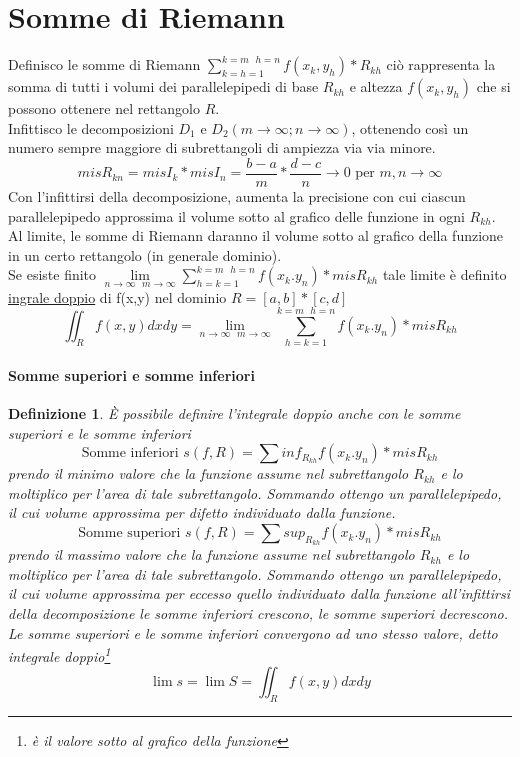 \documentclass{book}
\newtheorem{defi}{Definizione}
\begin{document}
\section{Somme di Riemann}
Definisco le somme di Riemann $\displaystyle\sum^{k=m\text{ } h=n}_{k=h=1}f(x_k,y_h)*R_{kh}$ ciò
rappresenta la somma di tutti i volumi dei parallelepipedi di base $R_{kh}$ e altezza $f(x_k,y_h)$
che si possono ottenere nel rettangolo $R$.\\
Infittisco le decomposizioni $D_1$ e $D_2(m\to \infty;n\to\infty)$, ottenendo così un numero sempre
maggiore di subrettangoli di ampiezza via via minore.
\begin{equation}
  mis R_{kn}=misI_k*misI_n=\frac{b-a}{m} * \frac{d-c}{n}\to 0 \text{ per }  m,n \to \infty
\end{equation}
Con l'infittirsi della decomposizione, aumenta la precisione con cui ciascun parallelepipedo
approssima il volume sotto al grafico delle funzione in ogni $R_{kh}$.\\
Al limite, le somme di Riemann daranno il volume sotto al grafico della funzione in un certo
rettangolo (in generale dominio).\\
Se esiste finito $\lim\limits_{n\to \infty\text{ } m\to \infty}\displaystyle\sum_{h=k=1}^{k=m\text{ }h=n}f(x_k.y_n)*misR_{kh}$ tale limite è definito \underline{\color{red} ingrale doppio} di f(x,y) nel
dominio $R=[a,b]*[c,d]$
\begin{equation}
  \iint_R f(x,y)dxdy=\lim\limits_{n\to \infty\text{ } m\to \infty}\displaystyle\sum_{h=k=1}^{k=m\text{ }h=n}f(x_k.y_n)*misR_{kh}
\end{equation}
\paragraph{Somme superiori e somme inferiori}
\begin{defi}
  È possibile definire l'integrale doppio anche con le somme superiori e le somme inferiori
  \begin{equation*}
    \text{Somme inferiori } s(f,R) = \displaystyle\sum inf_{R_{kh}}f(x_k.y_n)*misR_{kh}
  \end{equation*}
  prendo il minimo valore che la funzione assume nel subrettangolo $R_{kh}$ e lo moltiplico per
  l'area di tale subrettangolo. Sommando ottengo un parallelepipedo, il cui volume approssima
  per difetto individuato dalla funzione. 
  \begin{equation*}
    \text{Somme superiori } s(f,R) = \displaystyle\sum sup_{R_{kh}}f(x_k.y_n)*misR_{kh}
  \end{equation*}
  prendo il massimo valore che la funzione assume nel subrettangolo $R_{kh}$ e lo moltiplico per
  l'area di tale subrettangolo. Sommando ottengo un parallelepipedo, il cui volume approssima per
  eccesso quello individuato dalla funzione all'infittirsi della decomposizione le somme inferiori
  crescono, le somme superiori decrescono. Le somme superiori e le somme inferiori convergono ad
  uno stesso valore, detto {\color{red}integrale doppio}\footnote{è il valore sotto al grafico
    della funzione}
  \begin{equation*}
    \lim s=\lim S=\iint_R f(x,y)dxdy
  \end{equation*}
\end{defi}
\clearpage
\end{document}
